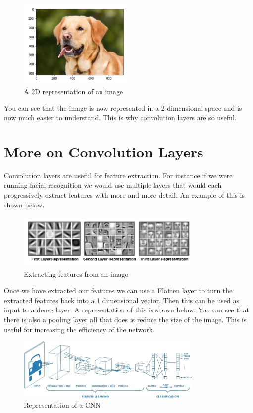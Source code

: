 \documentclass[11pt]{report}
\begin{document}
\begin{figure}[h]
\centering
\includegraphics[width=0.5\textwidth]{./images/dogconv.png}
\caption{A 2D representation of an image}
\label{fig:2d}
\end{figure}
You can see that the image is now represented in a 2 dimensional space and is now much easier to understand. This is why convolution layers are so useful. 

\section{More on Convolution Layers}
Convolution layers are useful for feature extraction. For instance if we were running facial recognition we would use multiple layers that would each progressively extract features with more and more detail. An example of this is shown below.

\begin{figure}[h]
\centering
\includegraphics[width=0.8\textwidth]{./images/featureextraction.jpg}
\caption{Extracting features from an image}
\label{fig:conv1}
\end{figure}

Once we have extracted our features we can use a Flatten layer to turn the extracted features back into a 1 dimensional vector. Then this can be used as input to a dense layer. A representation of this is shown below. You can see that there is also a pooling layer all that does is reduce the size of the image. This is useful for increasing the efficiency of the network. 

\begin{figure}[h]
\centering
\includegraphics[width=0.8\textwidth]{./images/convexamp.jpeg}
\caption{Representation of a CNN}
\label{fig:cnn}
\end{figure}
\end{document}

